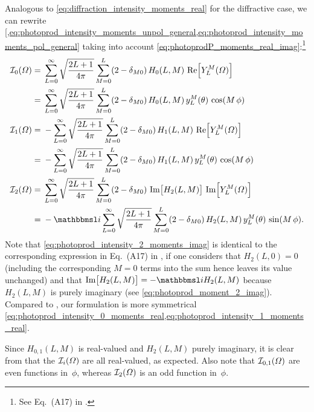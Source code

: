 Analogous to \cref{eq:diffraction_intensity_moments_real} for the
diffractive case, we can rewrite
\cref{,eq:photoprod_intensity_moments_unpol_general,eq:photoprod_intensity_moments_pol_general}
taking into account
\cref{eq:photoprodP_moments_real_imag}:\footnote{See Eq.~(A17) in
.}
\begin{align}
  \intensity_0(\Omega)
  ={}& \sum_{L = 0}^\infty \sqrt{\frac{2 L + 1}{4 \pi}} \sum_{M = 0}^{L} (2 - \delta_{M 0})\, H_0(L, M)\, \Re{Y_L^M(\Omega)} \nonumber
  \\
  \label{eq:photoprod_intensity_0_moments_real}
  ={}& \sum_{L = 0}^\infty \sqrt{\frac{2 L + 1}{4 \pi}} \sum_{M = 0}^{L} (2 - \delta_{M 0})\, H_0(L, M)\, y_L^M(\theta)\, \cos(M\, \phi)
  \\
  \intensity_1(\Omega)
  ={}& -\sum_{L = 0}^\infty \sqrt{\frac{2 L + 1}{4 \pi}} \sum_{M = 0}^{L} (2 - \delta_{M 0})\, H_1(L, M)\, \Re{Y_L^M(\Omega)} \nonumber
  \\
  \label{eq:photoprod_intensity_1_moments_real}
  ={}& -\sum_{L = 0}^\infty \sqrt{\frac{2 L + 1}{4 \pi}} \sum_{M = 0}^{L} (2 - \delta_{M 0})\, H_1(L, M)\, y_L^M(\theta)\, \cos(M\, \phi)
  \\
  \intensity_2(\Omega)
  ={}& \sum_{L = 0}^\infty \sqrt{\frac{2 L + 1}{4 \pi}} \sum_{M = 0}^{L} (2 - \delta_{M 0})\, \Im{H_2(L, M)}\, \Im{Y_L^M(\Omega)} \nonumber
  \\
  \label{eq:photoprod_intensity_2_moments_imag}
  ={}& -\imag \sum_{L = 0}^\infty \sqrt{\frac{2 L + 1}{4 \pi}} \sum_{M = 0}^{L} (2 - \delta_{M 0})\, H_2(L, M)\, y_L^M(\theta)\, \sin(M\, \phi).
\end{align}
Note that \cref{eq:photoprod_intensity_2_moments_imag} is identical to
the corresponding expression in Eq.~(A17) in
, if one considers that $H_2(L, 0) = 0$
(including the corresponding $M = 0$ terms into the sum hence leaves
its value unchanged) and that $\Im{H_2(L, M)} = -\imag H_2(L, M)$
because $H_2(L, M)$ is purely imaginary (see
\cref{eq:photoprod_moment_2_imag}).  Compared to
, our formulation is more symmetrical \wrt
\cref{eq:photoprod_intensity_0_moments_real,eq:photoprod_intensity_1_moments_real}.

Since $H_{0, 1}(L, M)$ is real-valued and $H_2(L, M)$ purely
imaginary, it is clear from
that the $\mathcal{I}_i(\Omega)$ are all real-valued, as expected.
Also note that $\mathcal{I}_{0, 1}(\Omega)$ are even functions
in~$\phi$, whereas $\mathcal{I}_2(\Omega)$ is an odd function
in~$\phi$.


